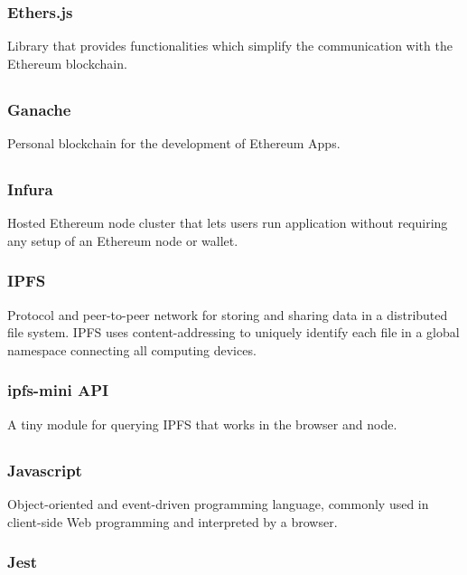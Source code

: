 		\subsubsection*{Ethers.js}
			Library that provides functionalities which simplify the communication with the Ethereum blockchain.
	
	\subsection*{}
		\subsubsection*{Ganache}
			Personal blockchain for the development of Ethereum \DJ{}Apps.
	
	\subsection*{}
		\subsubsection*{Infura}
			Hosted Ethereum node cluster that lets users run application without requiring any setup of an Ethereum node or wallet.
		\subsubsection*{IPFS}
			Protocol and peer-to-peer network for storing and sharing data in a distributed file system. IPFS uses content-addressing to uniquely identify each file in a global namespace connecting all computing devices. 
		\subsubsection*{ipfs-mini API}
			A tiny module for querying IPFS that works in the browser and node.
	
	\subsection*{}
		\subsubsection*{Javascript}
			Object-oriented and event-driven programming language, commonly used in client-side Web programming and interpreted by a browser.
		\subsubsection*{Jest}
	
